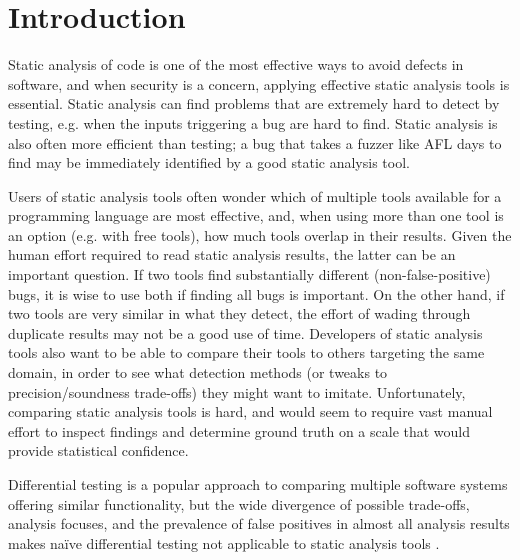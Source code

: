 \section{Introduction}

Static analysis of code is one of the most effective ways to avoid defects in software, and when security is a concern, applying effective static analysis tools is essential.  Static analysis can find problems that are extremely hard to detect by testing, e.g. when the inputs triggering a bug are hard to find.  Static analysis is also often more efficient than testing; a bug that takes a fuzzer like AFL days to find may be immediately identified by a good static analysis tool.

Users of static analysis tools often wonder which of multiple tools available for a programming language are most effective, and, when using more than one tool is an option (e.g. with free tools), how much tools overlap in their results.  Given the human effort required to read static analysis results, the latter can be an important question.  If two tools find substantially different (non-false-positive) bugs, it is wise to use both if finding all bugs is important.  On the other hand, if two tools are very similar in what they detect, the effort of wading through duplicate results may not be a good use of time.  Developers of static analysis tools also want to be able to compare their tools to others targeting the same domain, in order to see what detection methods (or tweaks to precision/soundness trade-offs) they might want to imitate.  Unfortunately, comparing static analysis tools is hard, and would seem to require vast manual effort to inspect findings and determine ground truth on a scale that would provide statistical confidence.

Differential testing \cite{Differential,ICSEDiff} is a popular approach to comparing multiple software systems offering similar functionality, but the wide divergence of possible trade-offs, analysis focuses, and the prevalence of false positives in almost all analysis results makes na\"ive differential testing not applicable to static analysis tools \cite{regehrRandom}.


